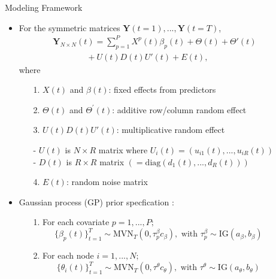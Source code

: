 \documentclass[serif,mathserif,final,table]{beamer}
\begin{document}
\begin{frame}{}
\begin{columns}[t]
\begin{column}{0.235\linewidth}
    \end{column}
    
    
    \begin{column}{0.235\linewidth}
           \begin{block}{Modeling Framework}
           	\begin{itemize}
           		\item For the symmetric matrices $\boldsymbol{Y}(t=1),...,\boldsymbol{Y}(t=T)$,
            \begin{equation*}
            \begin{aligned}
            &\boldsymbol{Y}_{N\times N}(t)=\sum_{p=1}^PX^p(t)\beta_p(t)+\Theta(t)+\Theta'(t)\\&\quad\quad\quad\quad+U(t)D(t)U'(t)+E(t), 
            \end{aligned}
            \end{equation*}
            where 
            \begin{enumerate}
            	\item[1.] $X(t)$ and $\beta(t)$: fixed effects from predictors
            	\item[2.] $\Theta(t)$ and $\Theta^\prime(t)$: additive row/column random effect
            	\item[3.] $U(t)D(t)U'(t)$: multiplicative random effect
            	\begin{tabbing}
            		- $U(t)$ is $N \times R$ matrix where $U_i(t) =(u_{i1}(t),...,u_{iR}(t))$ \\
            	- $D(t)$ is $R \times R$ matrix $(=\mbox{diag}(d_1(t),...,d_R(t)))$
            	\end{tabbing}
            	\item[4.] $E(t)$: random noise matrix
            \end{enumerate} 
            \vspace{10pt}
            \item Gaussian process (GP) prior specfication \cite{durante2014nonparametric}:
            \begin{enumerate}
         	\item[1.] For each covariate $p=1,...,P;$ $$\{\beta_{p}(t)\}_{t=1}^T\sim \mbox{MVN}_{T}(0, \tau^{\beta}_pc_\beta), \mbox{ with }\tau^{\beta}_p \sim \mbox{IG}(a_\beta, b_\beta)$$
         	\item[2.] For each node $i=1,...,N;$
         	$$\{\theta_{i}(t)\}_{t=1}^T \sim \mbox{MVN}_{T}(0, \tau^{\theta}c_\theta), \mbox{ with } \tau^{\theta}\sim \mbox{IG}(a_\theta, b_\theta)$$

\end{enumerate}
\end{itemize}
\end{block}
\end{column}
\end{columns}
\end{frame}
\end{document}
